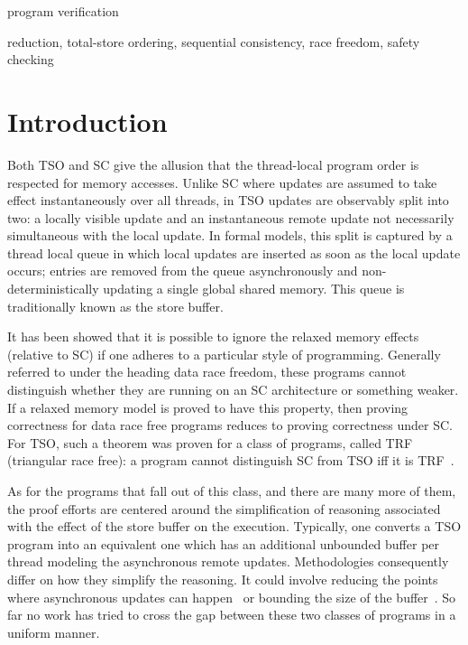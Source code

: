 \documentclass[preprint,9pt]{sigplanconf}
\begin{document}

\terms
program verification

\keywords
reduction, total-store ordering, sequential consistency, race freedom, safety checking 



\section{Introduction}
\label{sec:intro}
Both TSO and SC give the allusion that the thread-local program order is respected for memory accesses.
Unlike SC where updates are assumed to take effect instantaneously over all threads, in TSO updates are observably split into two: a locally visible update and an instantaneous remote update not necessarily simultaneous with the local update.
In formal models, this split is captured by a thread local queue in which local updates are inserted as soon as the local update occurs; entries are removed from the queue asynchronously and non-deterministically updating a single global shared memory. 
This queue is traditionally known as the store buffer.

It has been showed that it is possible to ignore the relaxed memory effects (relative to SC) if one adheres to a particular style of programming. 
Generally referred to under the heading data race freedom, these programs cannot distinguish whether they are running on an SC architecture or something weaker. 
If a relaxed memory model is proved to have this property, then proving correctness for data race free programs reduces to proving correctness under SC.
For TSO, such a theorem was proven for a class of programs, called TRF (triangular race free): a program cannot distinguish SC from TSO iff it is TRF~\cite{Owe2010}.

As for the programs that fall out of this class, and there are many more of them, the proof efforts are centered around the simplification of reasoning associated with the effect of the store buffer on the execution.
Typically, one converts a TSO program into an equivalent one which has an additional unbounded buffer per thread modeling the asynchronous remote updates. 
Methodologies consequently differ on how they simplify the reasoning. 
It could involve reducing the points where asynchronous updates can happen~\cite{AK20XX} or bounding the size of the buffer~\cite{BYZ20XX}.
So far no work has tried to cross the gap between these two classes of programs in a uniform manner.
\end{document}
